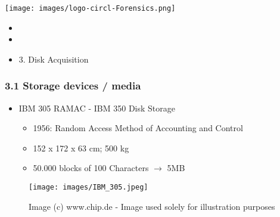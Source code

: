 %
%



\begin{frame}
    \texttt{[image: images/logo-circl-Forensics.png]}
    \begin{itemize}
        \item[]
        \item[]
        \item[] 3. Disk Acquisition
    \end{itemize}
\end{frame}


\begin{frame}[fragile]
  \frametitle{3.1 Storage devices / media}
    \begin{itemize}
        \item IBM 305 RAMAC - IBM 350 Disk Storage
        \begin{itemize}
            \item 1956: Random Access Method of Accounting and Control
            \item 152 x 172 x 63 cm; 500 kg
            \item 50.000 blocks of 100 Characters $\to$ 5MB
        \end{itemize}
    \end{itemize}
    \begin{figure}
        \texttt{[image: images/IBM\_305.jpeg]}
        \captionsetup{labelformat=empty,labelsep=none}
        \caption[]{\tiny Image (c) www.chip.de - Image used solely for illustration purposes}
    \end{figure}
\end{frame}


